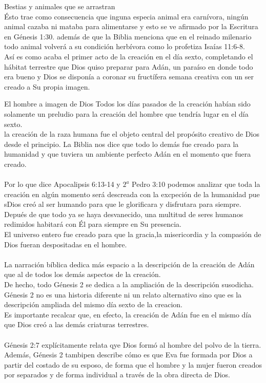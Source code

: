 \begin{section}{Bestias y animales que se arrastran}
\\
Ésto trae como consecuencia que inguna especia animal era carnívora, ningún animal cazaba ni mataba para alimentarse y esto se ve afirmado por la Escritura en Génesis 1:30. además de que la Biblia menciona que en el reinado milenario todo animal volverá a su condición herbívora como lo profetiza Isaías 11:6-8.\\
Así es como acaba el primer acto de la creación en el día sexto, completando el hábitat terrestre que Dios quiso preparar para Adán, un paraíso en donde todo era bueno y Dios se disponía a coronar su fructífera semana creativa con un ser creado a Su propia imagen.
\end{section}
\newpage
\begin{section}{El hombre a imagen de Dios}
	Todos los días pasados de la creación habían sido solamente un preludio para la creación del hombre que tendría lugar en el día sexto.\\
	la creación de la raza humana fue el objeto central del propósito creativo de Dios desde el principio. La Biblia nos dice que todo lo demás fue creado para la humanidad y que tuviera un ambiente perfecto Adán en el momento que fuera creado.\\
	\\
	Por lo que dice Apocalipsis 6:13-14 y $2^{a}$ Pedro 3:10 podemos analizar que toda la creación en algún momento será descreada con la excpeción de la humanidad pue sDios creó al ser humando para que le glorificara  y disfrutara para siempre. Depués de que todo ya se haya desvanecido, una multitud de seres humanos redimidos habitará con Él para siempre en Su presencia.\\
	El universo entero fue creado para que la gracia,la misericordia y la compasión de Dios fueran despositadas en el hombre.\\
	\\
	La narración bíblica dedica más espacio a la descripción de la creación de Adán que al de todos los demás aspectos de la creación.\\
	De hecho, todo Génesis 2 se dedica a la ampliación de la descripción susodicha. Génesis 2 no es una historia diferente ni un relato alternativo sino que es la descripción ampliada del mismo día sexto de la creacion.\\
	Es importante recalcar que, en efecto, la creación de Adán fue en el mismo día que Dios creó a las demás criaturas terrestres.\\
	\\
	Génesis 2:7 explícitamente relata qye Dios formó al hombre del polvo de la tierra. Además, Génesis 2 tambipen describe cómo es que Eva fue formada por Dios a partir del costado de su esposo, de forma que el hombre y la mujer fueron creados por separados y de forma individual a través de la obra directa de Dios.\\

\end{section}

